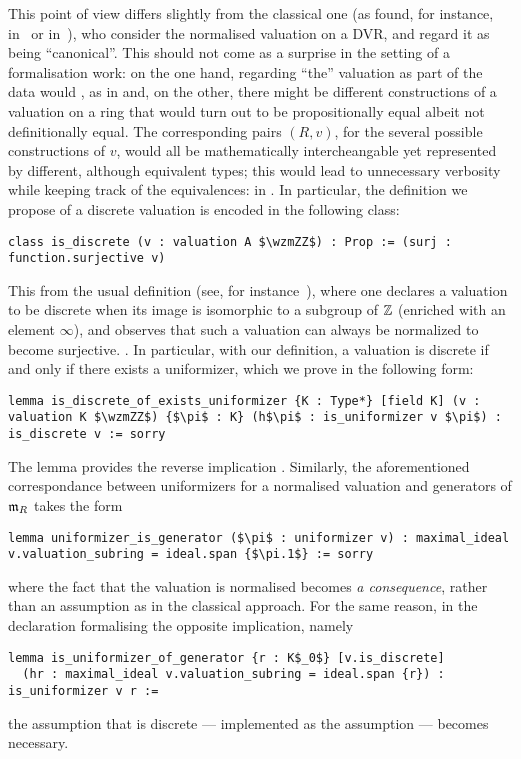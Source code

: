 \documentclass[sigplan,10pt,anonymous,review]{acmart}
\begin{document}
This point of view differs slightly from the classical one (as found, for instance, in~\cite[Chapitre~I]{Ser62} or in~\cite[???]{Bou85}), who  consider the normalised valuation on a DVR, and regard it as being ``canonical''. This should not come as a surprise in the setting of a formalisation work: on the one hand, regarding ``the'' valuation as part of the data would , as in  and, on the other, there might be different constructions of a valuation on a ring that would turn out to be propositionally equal albeit not definitionally equal. The corresponding pairs $(R,v)$, for the several possible constructions of $v$, would all be mathematically intercheangable yet represented by different, although equivalent types; this would lead to unnecessary verbosity while keeping track of the equivalences: in . In particular, the definition we propose of a discrete valuation is encoded in the following class:
\begin{lstlisting}
class is_discrete (v : valuation A $\wzmZZ$) : Prop := (surj : function.surjective v)
\end{lstlisting}
This  from the usual definition (see, for instance~\cite[Proposition~I.1]{Ser62}), where one declares a valuation to be discrete when its image is isomorphic to a subgroup of $\mathbb{Z}$ (enriched with an element $\infty$), and observes that such a valuation can always be normalized to become surjective. . In particular, with our definition, a valuation is discrete if and only if there exists a uniformizer, which we prove in the following form:
\begin{lstlisting}
lemma is_discrete_of_exists_uniformizer {K : Type*} [field K] (v : valuation K $\wzmZZ$) {$\pi$ : K} (h$\pi$ : is_uniformizer v $\pi$) : is_discrete v := sorry
\end{lstlisting}
The lemma  provides the reverse implication . Similarly, the aforementioned correspondance between uniformizers for a normalised valuation and generators of $\mathfrak{m}_{R}$ takes the form
\begin{lstlisting}
lemma uniformizer_is_generator ($\pi$ : uniformizer v) : maximal_ideal v.valuation_subring = ideal.span {$\pi.1$} := sorry
\end{lstlisting}
where the fact that the valuation is normalised becomes \emph{a consequence}, rather than an assumption as in the classical approach. For the same reason, in the declaration formalising the opposite implication, namely
\begin{lstlisting}
lemma is_uniformizer_of_generator {r : K$_0$} [v.is_discrete]
  (hr : maximal_ideal v.valuation_subring = ideal.span {r}) : is_uniformizer v r :=
\end{lstlisting}
the assumption that  is discrete --- implemented as the  assumption \code{[v.is_discrete]} --- becomes necessary.
\end{document}

